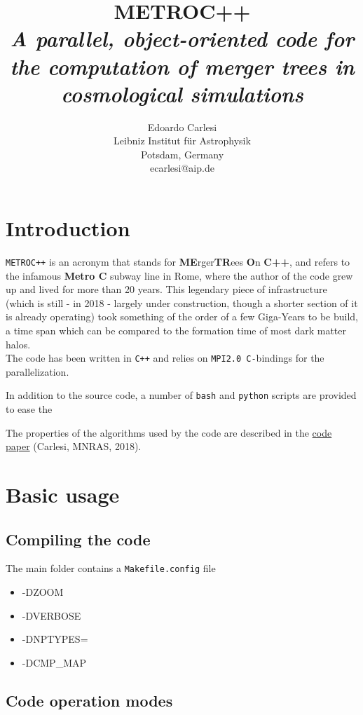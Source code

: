 \documentclass{article}
\title{\textbf{METROC++} \\
\emph{A parallel, object-oriented code for the computation of merger trees in 
cosmological simulations}}
\author{Edoardo Carlesi\\ Leibniz Institut f\"ur Astrophysik\\ Potsdam, Germany\\ ecarlesi@aip.de}
\begin{document}
\maketitle
\tableofcontents
\newpage

\section{Introduction}
\texttt{METROC++} is an acronym that stands for \textbf{ME}rger\textbf{TR}ees \textbf{O}n \textbf{C++}, and refers to the 
infamous \textbf{Metro C} subway line in Rome, where the author of the code grew up and lived for more than 20 years.
This legendary piece of infrastructure (which is still - in 2018 - largely under construction, though a shorter section of 
it is already operating) took something of the order of a few Giga-Years to be build, a time span which can be compared to the
formation time of most dark matter halos.\\

The code has been written in \texttt{C++} and relies on \texttt{MPI2.0 C-}bindings for the parallelization.

In addition to the source code, a number of \texttt{bash} and \texttt{python} scripts are provided to ease the 

The properties of the algorithms used by the code are described in the \href{https://arxiv.org/abs/1612.07053}{code paper} (Carlesi, MNRAS, 2018).



\section{Basic usage}
\subsection{Compiling the code}

The main folder contains a \texttt{Makefile.config} file 

\begin{itemize}
\item {-DZOOM}
\item {-DVERBOSE}
\item {-DNPTYPES=}
\item {-DCMP_MAP}
\end{itemize}

\subsection{Code operation modes}
\end{document}
